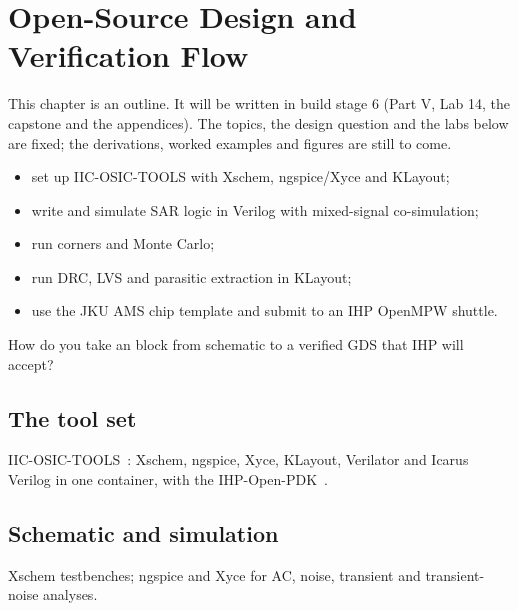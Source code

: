 \chapter{Open-Source Design and Verification Flow}\label{ch:flow}

\begin{specnote}
This chapter is an outline. It will be written in build stage 6 (Part V, Lab 14, the capstone and the appendices). The topics, the design question and the labs below are fixed; the derivations, worked examples and figures are still to come.
\end{specnote}

\begin{objectives}
\begin{itemize}
  \item set up IIC-OSIC-TOOLS with Xschem, ngspice/Xyce and KLayout;
  \item write and simulate SAR logic in Verilog with mixed-signal co-simulation;
  \item run corners and Monte Carlo;
  \item run DRC, LVS and parasitic extraction in KLayout;
  \item use the JKU AMS chip template and submit to an IHP OpenMPW shuttle.
\end{itemize}
\end{objectives}

\begin{insight}
How do you take an \OB{} block from schematic to a verified GDS that IHP will accept?
\end{insight}

\section{The tool set}\label{sec:ch30-1}
IIC-OSIC-TOOLS~\cite{iicosic}: Xschem, ngspice, Xyce, KLayout, Verilator and Icarus Verilog in one container, with the IHP-Open-PDK~\cite{ihppdk}.

\section{Schematic and simulation}\label{sec:ch30-2}
Xschem testbenches; ngspice and Xyce for AC, noise, transient and transient-noise analyses.

